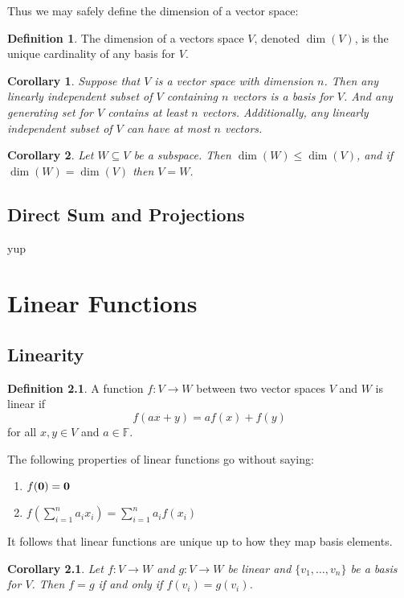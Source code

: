 \documentclass[oneside, 12pt]{book}
\newtheorem{cor}{Corollary}[section]
\theoremstyle{definition}
\newtheorem{defn}{Definition}[section]
\begin{document}
Thus we may safely define the dimension of a vector space:
\begin{defn}
\label{defn_dim}
The dimension of a vectors space $V$, denoted $\dim(V)$, is the unique cardinality of any basis for $V$.
\end{defn}
\begin{cor}
\label{cor_base}
Suppose that $V$ is a vector space with dimension $n$. Then any linearly independent subset of $V$ containing $n$ vectors is a basis for $V$.
And any generating set for $V$ contains at least $n$ vectors.
Additionally, any linearly independent subset of $V$ can have at most $n$ vectors.
\end{cor}
\begin{cor}
\label{cor_bassub}
Let $W\subseteq V$ be a subspace. Then $\dim(W)\leq \dim(V)$, and if $\dim(W)=\dim(V)$ then $V=W$.
\end{cor}
\section{Direct Sum and Projections}
yup
\chapter{Linear Functions}
\section{Linearity}
\begin{defn}
\label{defn_lin}
  A function $f: V \to W$ between two vector spaces $V$ and $W$ is linear if
  \[f(ax+y)=af(x)+f(y)\] for all $x, y \in V$ and $a \in \mathbb{F}$.
\end{defn}
The following properties of linear functions go without saying:
\begin{enumerate}
  \item $f(\bold{0})=\bold{0}$
  \item $f(\sum_{i=1}^{n}a_{i}x_{i})=\sum_{i=1}^{n}a_{i}f(x_{i})$
\end{enumerate}
It follows that linear functions are unique up to how they map basis elements.
\begin{cor}
\label{cor_linbas}
  Let $f:V \to W$ and $g: V \to W$ be linear and $\{v_{1}, \dots, v_{n}\}$ be a basis for $V$. Then $f=g$ if and only if $f(v_{i})=g(v_{i})$.
\end{cor}
\end{document}
